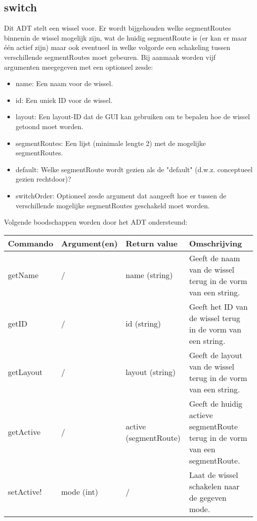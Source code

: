 \documentclass{article}
\begin{document}
\subsection{switch}
Dit ADT stelt een wissel voor. Er wordt bijgehouden welke segmentRoutes binnenin de wissel mogelijk zijn, wat de huidig segmentRoute is (er kan er maar één actief zijn) maar ook eventueel in welke volgorde een schakeling tussen verschillende segmentRoutes moet gebeuren. Bij aanmaak worden vijf argumenten meegegeven met een optioneel zesde:
\begin{itemize}
  \item name: Een naam voor de wissel.
  \item id: Een uniek ID voor de wissel.
  \item layout: Een layout-ID dat de GUI kan gebruiken om te bepalen hoe de wissel getoond moet worden.
  \item segmentRoutes: Een lijst (minimale lengte 2) met de mogelijke segmentRoutes.
  \item default: Welke segmentRoute wordt gezien als de "default" (d.w.z. conceptueel gezien rechtdoor)?
  \item switchOrder: Optioneel zesde argument dat aangeeft hoe er tussen de verschillende mogelijke segmentRoutes geschakeld moet worden.
\end{itemize}
Volgende boodschappen worden door het ADT ondersteund:
\begin{center}
    \begin{tabular}{ | l | l | l | p{8cm} |}
    \hline
    Commando & Argument(en) & Return value & Omschrijving \\ \hline
    getName & / & name (string) & Geeft de naam van de wissel terug in de vorm van een string. \\ \hline
    getID & / & id (string) & Geeft het ID van de wissel terug in de vorm van een string. \\ \hline
    getLayout & / & layout (string) & Geeft de layout van de wissel terug in de vorm van een string. \\ \hline
    getActive & / & active (segmentRoute) & Geeft de huidig actieve segmentRoute terug in de vorm van een segmentRoute. \\ \hline
    setActive! & mode (int) & / & Laat de wissel schakelen naar de gegeven mode. \\ \hline
    \end{tabular}
\end{center}
\end{document}
